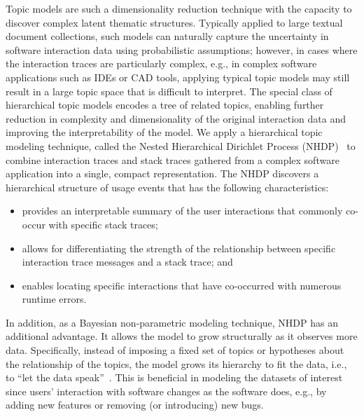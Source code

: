 Topic models are such a dimensionality reduction technique with the capacity to
discover complex latent thematic structures. Typically applied to large textual
document collections, such models can naturally capture the uncertainty in
software interaction data using probabilistic assumptions; however, in cases
where the interaction traces are particularly complex, e.g., in complex software
applications such as IDEs or CAD tools, applying typical topic models may still
result in a large topic space that is difficult to interpret. The special class
of hierarchical topic models encodes a tree of related topics, enabling further
reduction in complexity and dimensionality of the original interaction data and
improving the interpretability of the model. We apply a hierarchical topic
modeling technique, called the Nested Hierarchical Dirichlet Process
(NHDP)~\cite{6802355} to combine interaction traces and stack traces gathered
from a complex software application into a single, compact representation. The
NHDP discovers a hierarchical structure of usage events that has the following
characteristics:

\begin{itemize}
\item provides an interpretable summary of the user interactions that commonly co-occur with specific stack traces;
\item allows for differentiating the strength of the relationship between specific interaction trace messages and a stack trace; and
\item enables locating specific interactions that have co-occurred with numerous runtime errors.
\end{itemize}

\noindent In addition, as a Bayesian non-parametric modeling technique, NHDP
has an additional advantage. It allows the model to grow structurally as it
observes more data. Specifically, instead of imposing a fixed set of topics or
hypotheses about the relationship of the topics, the model grows its hierarchy
to fit the data, i.e., to ``let the data
speak''~\cite{Blei:2010:NCR:1667053.1667056}. This is beneficial in modeling the
datasets of interest since users' interaction with software
changes as the software does, e.g., by adding new features or
removing (or introducing) new bugs. 


